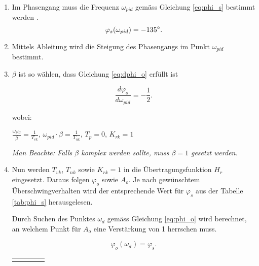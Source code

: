 \begin{enumerate}
    \item
        Im  Phasengang muss  die  Frequenz  $\omega_{pid}$ gem\"ass  Gleichung
        \ref{eq:phi_s} bestimmt werden \footnotemark[1].
        \begin{equation} \label{eq:phi_s}
            \varphi_s(\omega_{pid}) = -135 \degree.
        \end{equation}
    \item
        Mittels  Ableitung  wird  die  Steigung des  Phasengangs  im  Punkt  $
        \omega_{pid} $ bestimmt.
    \item
        $\beta$ ist so w\"ahlen, dass Gleichung \ref{eq:dphi_o} erf\"ullt ist

        \begin{equation} \label{eq:dphi_o}
            \frac{d\varphi_o}{d\omega_{pid}}= -\frac{1}{2}.
        \end{equation}

        wobei:
        \vspace*{1em}

        \begin{center}
            $\frac{\omega_{pid}}{\beta}=\frac{1}{T_{vk}}$,
            $\omega_{pid} \cdot \beta=\frac{1}{T_{nk}}$,
            $T_p = 0$,
            $K_{rk} = 1$
        \end{center}

        \vspace*{1em}
        {\em{Man Beachte: Falls $\beta$ komplex werden sollte, muss $\beta=1$ gesetzt werden.}}
        \vspace*{1em}
    \item
        Nun   werden    $T_{vk}$,   $T_{nk}$   sowie   $K_{rk}=1$    in   die
        \"Ubertragungsfunktion  $H_r$  eingesetzt. Daraus folgen  $\varphi_o$
        sowie $A_o$.   Je nach  gew\"unschtem \"Uberschwingverhalten  wird der
        entsprechende Wert  f\"ur $\varphi_s$ aus der  Tabelle \ref{tab:phi_s}
        herausgelesen.

        Durch Suchen des Punktes  $\omega_d$ gem\"ass Gleichung \ref{eq:phi_o}
        wird berechnet, an welchem Punkt  f\"ur $A_o$ eine Verst\"arkung von 1
        herrschen muss.

        \begin{equation} \label{eq:phi_o}
            \varphi_o(\omega_d)=\varphi_s.
        \end{equation}

        \begin{longtable}{llll}
            \toprule
            \endhead
            \endfoot
            \endlastfoot


\end{longtable}
\end{enumerate}
